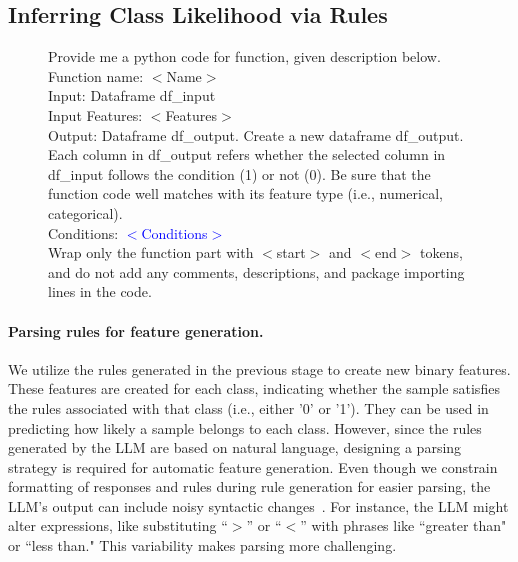 \documentclass{article}
\theoremstyle{plain}
\theoremstyle{definition}
\theoremstyle{remark}
\begin{document}
\subsection{Inferring Class Likelihood via Rules}
\label{Sec:training}


\begin{figure}[t!]
\begin{tcolorbox}[enhanced,attach boxed title to top center={yshift=-3mm,yshifttext=-1mm},
  colback=black!0!white, colframe=black!20!white, colbacktitle=black!10!white, coltitle=blue!20!black ]
\footnotesize{
Provide me a python code for function, given description below. \\

Function name: $<$Name$>$ \\
Input: Dataframe df\_input \\
Input Features: $<$Features$>$ \\
Output: Dataframe df\_output. Create a new dataframe df\_output. Each column in df\_output refers whether the selected column in df\_input follows the condition (1) or not (0). Be sure that the function code well matches with its feature type (i.e., numerical, categorical). \\


Conditions: \textcolor{blue}{$<$Conditions$>$} \\

Wrap only the function part with $<$start$>$ and $<$end$>$ tokens, and do not add any comments, descriptions, and package importing lines in the code.
}
\end{tcolorbox}
\label{fig:prompt_for_parsing}  
\end{figure}

\paragraph{Parsing rules for feature generation.} We utilize the rules generated in the previous stage to create new binary features. These features are created for each class, indicating whether the sample satisfies the rules associated with that class (i.e., either '0' or '1'). They can be used in predicting how likely a sample belongs to each class. However, since the rules generated by the LLM are based on natural language, designing a parsing strategy is required for automatic feature generation. Even though we constrain formatting of responses and rules during rule generation for easier parsing, the LLM's output can include noisy syntactic changes~\cite{kovavc2023large}. For instance, the LLM might alter expressions, like substituting ``$>$” or ``$<$” with phrases like ``greater than" or ``less than." This variability makes parsing more challenging. 
\end{document}
